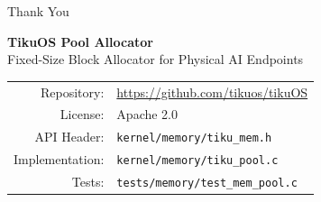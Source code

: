 \documentclass[aspectratio=169, 10pt]{beamer}
\begin{document}
\begin{frame}{Thank You}
\begin{center}
\Large\textbf{TikuOS Pool Allocator}\\[0.5em]
\normalsize Fixed-Size Block Allocator for Physical AI Endpoints\\[1.5em]

\begin{tabular}{rl}
  Repository: & \url{https://github.com/tikuos/tikuOS} \\
  License:    & Apache 2.0 \\
  API Header: & \texttt{kernel/memory/tiku\_mem.h} \\
  Implementation: & \texttt{kernel/memory/tiku\_pool.c} \\
  Tests:      & \texttt{tests/memory/test\_mem\_pool.c} \\
\end{tabular}
\end{center}
\end{frame}
\end{document}
